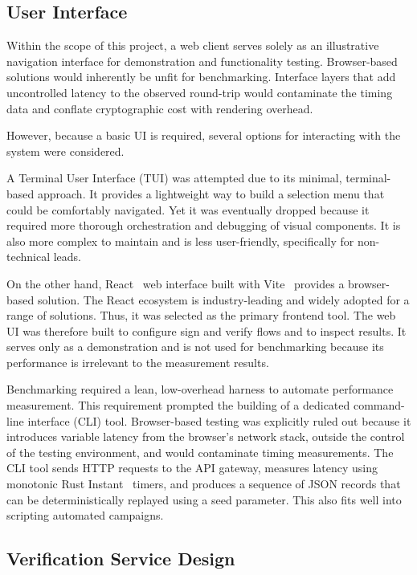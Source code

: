 \documentclass[12pt,a4paper]{article}
\begin{document}
\subsection{User Interface}

Within the scope of this project, a web client serves solely as an illustrative navigation interface for demonstration and functionality testing. Browser-based solutions would inherently be unfit for benchmarking. Interface layers that add uncontrolled latency to the observed round-trip would contaminate the timing data and conflate cryptographic cost with rendering overhead.

However, because a basic UI is required, several options for interacting with the system were considered.

A Terminal User Interface (TUI) was attempted due to its minimal, terminal-based approach. It provides a lightweight way to build a selection menu that could be comfortably navigated. Yet it was eventually dropped because it required more thorough orchestration and debugging of visual components. It is also more complex to maintain and is less user-friendly, specifically for non-technical leads.

On the other hand, React~\cite{react-docs} web interface built with Vite~\cite{vite-docs} provides a browser-based solution. The React ecosystem is industry-leading and widely adopted for a range of solutions. Thus, it was selected as the primary frontend tool. The web UI was therefore built to configure sign and verify flows and to inspect results. It serves only as a demonstration and is not used for benchmarking because its performance is irrelevant to the measurement results.

Benchmarking required a lean, low-overhead harness to automate performance measurement. This requirement prompted the building of a dedicated command-line interface (CLI) tool. Browser-based testing was explicitly ruled out because it introduces variable latency from the browser's network stack, outside the control of the testing environment, and would contaminate timing measurements. The CLI tool sends HTTP requests to the API gateway, measures latency using monotonic Rust Instant~\cite{rust-std-instant} timers, and produces a sequence of JSON records that can be deterministically replayed using a seed parameter. This also fits well into scripting automated campaigns.

\subsection{Verification Service Design}
\end{document}
